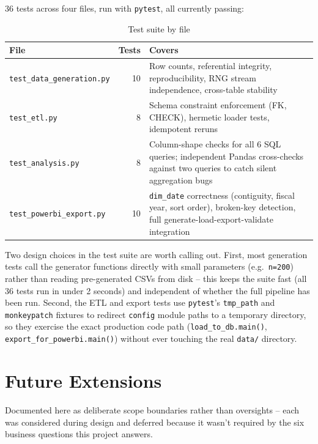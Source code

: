 \documentclass[11pt,a4paper]{report}
\begin{document}
36 tests across four files, run with \texttt{pytest}, all currently
passing:

\begin{table}[H]
\centering
\caption{Test suite by file}
\begin{tabular}{lrp{7.5cm}}
\toprule
\textbf{File} & \textbf{Tests} & \textbf{Covers} \\
\midrule
\texttt{test\_data\_generation.py} & 10 & Row counts, referential integrity,
  reproducibility, RNG stream independence, cross-table stability \\
\texttt{test\_etl.py} & 8 & Schema constraint enforcement (FK, CHECK),
  hermetic loader tests, idempotent reruns \\
\texttt{test\_analysis.py} & 8 & Column-shape checks for all 6 SQL queries;
  independent Pandas cross-checks against two queries to catch silent
  aggregation bugs \\
\texttt{test\_powerbi\_export.py} & 10 & \texttt{dim\_date} correctness
  (contiguity, fiscal year, sort order), broken-key detection, full
  generate-load-export-validate integration \\
\bottomrule
\end{tabular}
\end{table}

Two design choices in the test suite are worth calling out. First, most
generation tests call the generator functions directly with small
parameters (e.g.\ \texttt{n=200}) rather than reading pre-generated CSVs
from disk -- this keeps the suite fast (all 36 tests run in under 2
seconds) and independent of whether the full pipeline has been run.
Second, the ETL and export tests use \texttt{pytest}'s \texttt{tmp\_path}
and \texttt{monkeypatch} fixtures to redirect \texttt{config} module paths
to a temporary directory, so they exercise the exact production code path
(\texttt{load\_to\_db.main()}, \texttt{export\_for\_powerbi.main()}) without
ever touching the real \texttt{data/} directory.

\chapter{Future Extensions}
\label{ch:future}

Documented here as deliberate scope boundaries rather than oversights --
each was considered during design and deferred because it wasn't required
by the six business questions this project answers.
\end{document}

